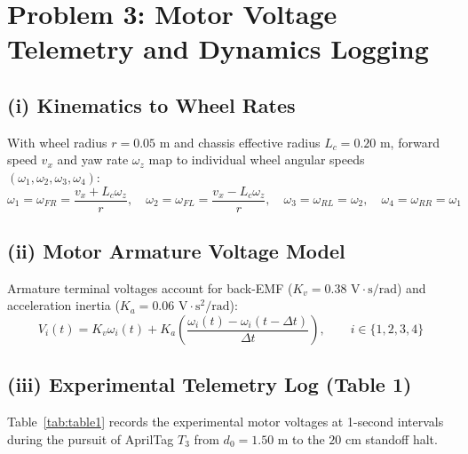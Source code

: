 \documentclass[10pt,a4paper]{article}
\begin{document}
\newpage
\section*{Problem 3: Motor Voltage Telemetry and Dynamics Logging}

\subsection*{(i) Kinematics to Wheel Rates}
With wheel radius $r = 0.05\text{~m}$ and chassis effective radius $L_c = 0.20\text{~m}$, forward speed $v_x$ and yaw rate $\omega_z$ map to individual wheel angular speeds $(\omega_1, \omega_2, \omega_3, \omega_4)$:
\begin{equation}
    \omega_1 = \omega_{FR} = \frac{v_x + L_c\omega_z}{r}, \quad
    \omega_2 = \omega_{FL} = \frac{v_x - L_c\omega_z}{r}, \quad
    \omega_3 = \omega_{RL} = \omega_2, \quad
    \omega_4 = \omega_{RR} = \omega_1
\end{equation}

\subsection*{(ii) Motor Armature Voltage Model}
Armature terminal voltages account for back-EMF ($K_v = 0.38\text{~V}\cdot\text{s/rad}$) and acceleration inertia ($K_a = 0.06\text{~V}\cdot\text{s}^2\text{/rad}$):
\begin{equation}
    V_i(t) = K_v \omega_i(t) + K_a \left(\frac{\omega_i(t) - \omega_i(t - \Delta t)}{\Delta t}\right), \qquad i \in \{1, 2, 3, 4\}
\end{equation}

\subsection*{(iii) Experimental Telemetry Log (Table 1)}
Table~\ref{tab:table1} records the experimental motor voltages at 1-second intervals during the pursuit of AprilTag $T_3$ from $d_0 = 1.50\text{~m}$ to the $20\text{~cm}$ standoff halt.
\end{document}

